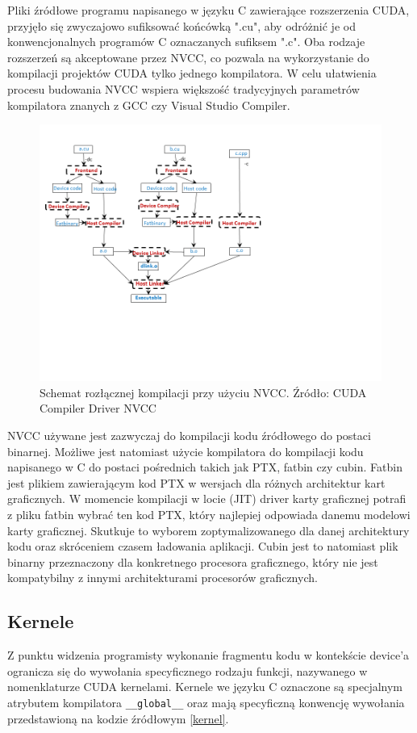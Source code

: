 Pliki źródłowe programu napisanego w języku C zawierające rozszerzenia CUDA, przyjęło się zwyczajowo
sufiksować końcówką ".cu", aby odróżnić je od konwencjonalnych programów C
oznaczanych sufiksem ".c". Oba rodzaje rozszerzeń są akceptowane przez NVCC, co
pozwala na wykorzystanie do kompilacji projektów CUDA tylko jednego kompilatora.
W celu ułatwienia procesu budowania NVCC wspiera większość tradycyjnych
parametrów kompilatora znanych z GCC czy Visual Studio Compiler. 

\begin{figure}[ht]
\centering
\includegraphics[scale=0.8]{images/nvcc-options-for-separate-compilation.png}
\caption{Schemat rozłącznej kompilacji przy użyciu NVCC. Źródło: CUDA Compiler Driver NVCC}
\label{compilation}
\end{figure}

NVCC używane jest zazwyczaj do kompilacji kodu źródłowego do postaci binarnej.
Możliwe jest natomiast użycie kompilatora do kompilacji kodu napisanego w
C do postaci pośrednich takich jak PTX, fatbin czy cubin. Fatbin jest plikiem
zawierającym kod PTX w wersjach dla różnych architektur kart graficznych.
W momencie kompilacji w locie (JIT) driver karty graficznej potrafi z pliku
fatbin wybrać ten kod PTX, który najlepiej odpowiada danemu modelowi karty
graficznej. Skutkuje to wyborem zoptymalizowanego dla danej architektury kodu
oraz skróceniem czasem ładowania aplikacji.
Cubin jest to natomiast plik binarny
przeznaczony dla konkretnego procesora graficznego, który nie jest
kompatybilny z innymi architekturami procesorów graficznych.


\subsection{Kernele}
Z punktu widzenia programisty wykonanie fragmentu kodu w kontekście device'a
ogranicza się do wywołania specyficznego rodzaju funkcji, nazywanego w nomenklaturze CUDA kernelami.
Kernele we języku C oznaczone są specjalnym atrybutem kompilatora
\texttt{\_\_global\_\_} oraz mają
specyficzną konwencję wywołania przedstawioną na kodzie źródłowym \ref{kernel}.

